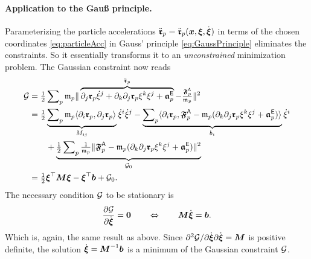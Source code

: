 \paragraph{Application to the Gauß principle.}
Parameterizing the particle accelerations $\particlePosdd{\PidxI} = \particlePosdd{\PidxI}(\sysCoord, \sysVel, \sysVeld)$ in terms of the chosen coordinates \eqref{eq:particleAcc} in Gauss' principle \eqref{eq:GaussPrinciple} eliminates the constraints.
So it essentially transforms it to an \textit{unconstrained} minimization problem.
The Gaussian constraint now reads
\begin{align}
 \GaussianConstraint &= \tfrac{1}{2} \sumParticles \particleMass{\PidxI} \norm{\overbrace{\dirDiff{\LidxII} \particlePos{\PidxI} \sysVelCoeffd{\LidxII} + \dirDiff{\LidxIII} \dirDiff{\LidxII} \particlePos{\PidxI} \sysVelCoeff{\LidxIII} \sysVelCoeff{\LidxII} + \particleAccTime{\PidxI}}^{\particlePosdd{\PidxI}} - \tfrac{\particleForceImpressed{\PidxI}}{\particleMass{\PidxI}}}^2
\nonumber\\
 &= \tfrac{1}{2} \underbrace{\sumParticles \particleMass{\PidxI} \sProd{\dirDiff{\LidxI} \particlePos{\PidxI}}{\dirDiff{\LidxII} \particlePos{\PidxI}}}_{\sysInertiaMatCoeff{\LidxI\LidxII}} \sysVelCoeffd{\LidxI}\sysVelCoeffd{\LidxII}
 - \underbrace{\sumParticles \sProd{\dirDiff{\LidxI} \particlePos{\PidxI}}{\particleForceImpressed{\PidxI} - \particleMass{\PidxI} (\dirDiff{\LidxIII} \dirDiff{\LidxII} \particlePos{\PidxI} \sysVelCoeff{\LidxIII} \sysVelCoeff{\LidxII} + \particleAccTime{\PidxI})}}_{\sysForceCoeff{\LidxI}} \sysVelCoeffd{\LidxI}
\nonumber\\
 &\qquad + \underbrace{\tfrac{1}{2} \sumParticles \tfrac{1}{\particleMass{\PidxI}}\norm{\particleForceImpressed{\PidxI} - \particleMass{\PidxI} (\dirDiff{\LidxIII} \dirDiff{\LidxII} \particlePos{\PidxI} \sysVelCoeff{\LidxIII} \sysVelCoeff{\LidxII} + \particleAccTime{\PidxI})}^2}_{\GaussianConstraint_0}
\nonumber\\
 &= \tfrac{1}{2} \sysVel^\top \sysInertiaMat \sysVel - \sysVel^\top \sysForce + \GaussianConstraint_0.
\end{align}
The necessary condition $\GaussianConstraint$ to be stationary is 
\begin{align}
 \pdiff[\GaussianConstraint]{\sysVeld} = \tuple{0}
\qquad\Leftrightarrow\qquad
 \sysInertiaMat \sysVeld = \sysForce.
\end{align}
Which is, again, the same result as above.
Since $\sfrac{\partial^2 \GaussianConstraint}{\partial\sysVeld \partial \sysVeld} = \sysInertiaMat$ is positive definite, the solution $\sysVeld = \sysInertiaMat^{-1}\sysForce$ is a minimum of the Gaussian constraint $\GaussianConstraint$.

